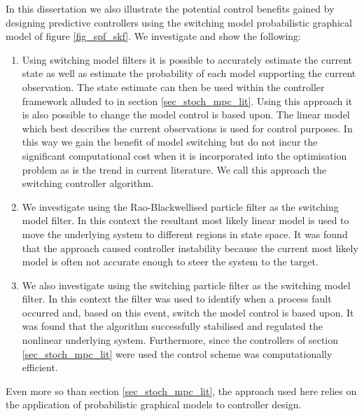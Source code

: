 In this dissertation we also illustrate the potential control benefits gained by designing predictive controllers using the switching model probabilistic graphical model of figure \ref{fig_spf_skf}. We investigate and show the following:
\begin{enumerate}
\item
Using switching model filters it is possible to accurately estimate the current state as well as estimate the probability of each model supporting the current observation. The state estimate can then be used within the controller framework alluded to in section \ref{sec_stoch_mpc_lit}. Using this approach it is also possible to change the model control is based upon. The linear model which best describes the current observations is used for control purposes. In this way we gain the benefit of model switching but do not incur the significant computational cost when it is incorporated into the optimisation problem as is the trend in current literature. We call this approach the switching controller algorithm.
\item
We investigate using the Rao-Blackwellised particle filter as the switching model filter. In this context the resultant most likely linear model is used to move the underlying system to different regions in state space. It was found that the approach caused controller instability because the current most likely model is often not accurate enough to steer the system to the target.
\item
We also investigate using the switching particle filter as the switching model filter. In this context the filter was used to identify when a process fault occurred and, based on this event, switch the model control is based upon. It was found that the algorithm successfully stabilised and regulated the nonlinear underlying system. Furthermore, since the controllers of section \ref{sec_stoch_mpc_lit} were used the control scheme was computationally efficient.
\end{enumerate}
Even more so than section \ref{sec_stoch_mpc_lit}, the approach used here relies on the application of probabilistic graphical models to controller design.  
